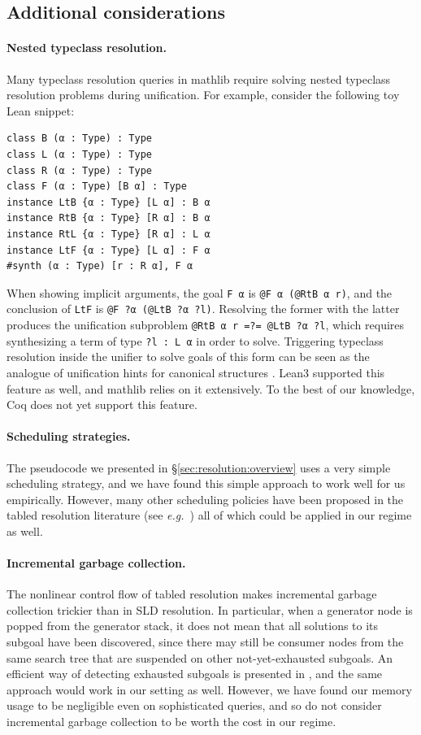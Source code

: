 \documentclass[runningheads]{llncs}
\newcommand\eg{\emph{e.g.}\ }
\begin{document}
\subsection{Additional considerations}
\label{sec:resolution:details}
\paragraph{Nested typeclass resolution.}
Many typeclass resolution queries in \textsf{mathlib} require solving nested typeclass resolution problems during unification.
For example, consider the following toy Lean snippet:
\begin{lstlisting}
class B (α : Type) : Type
class L (α : Type) : Type
class R (α : Type) : Type
class F (α : Type) [B α] : Type
instance LtB {α : Type} [L α] : B α
instance RtB {α : Type} [R α] : B α
instance RtL {α : Type} [R α] : L α
instance LtF {α : Type} [L α] : F α
#synth (α : Type) [r : R α], F α
\end{lstlisting}
When showing implicit arguments, the goal \lstinline{F α} is \lstinline{@F α (@RtB α r)},
and the conclusion of \lstinline{LtF} is \lstinline{@F ?α (@LtB ?α ?l)}.
Resolving the former with the latter produces the unification subproblem \lstinline{@RtB α r =?= @LtB ?α ?l},
which requires synthesizing a term of type \lstinline{?l : L α} in order to solve.
Triggering typeclass resolution inside the unifier to solve goals of this form can be seen as the
analogue of unification hints for canonical structures \cite{mahboubi2013canonical}.
Lean3 supported this feature as well, and \textsf{mathlib} relies on it extensively.
To the best of our knowledge, Coq does not yet support this feature.

\paragraph{Scheduling strategies.}
The pseudocode we presented in \S\ref{sec:resolution:overview} uses a very simple scheduling strategy,
and we have found this simple approach to work well for us empirically.
However, many other scheduling policies have been proposed in the tabled resolution literature (see \eg \cite{swift2012xsb})
all of which could be applied in our regime as well.

\paragraph{Incremental garbage collection.}
The nonlinear control flow of tabled resolution makes incremental garbage collection trickier than in SLD resolution.
In particular, when a generator node is popped from the generator stack, it does not mean that all solutions to its subgoal have been discovered,
since there may still be consumer nodes from the same search tree that are suspended on other not-yet-exhausted subgoals.
An efficient way of detecting exhausted subgoals is presented in \cite{sagonas1998abstract}, and the same approach would work in our setting as well.
However, we have found our memory usage to be negligible even on sophisticated queries,
and so do not consider incremental garbage collection to be worth the cost in our regime.
\end{document}
